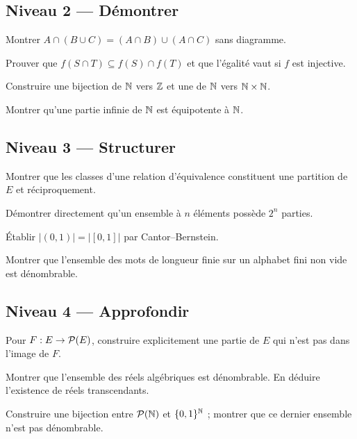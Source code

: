 \subsection*{Niveau 2 — Démontrer}
\begin{exercice}[Distributivité]\label{ex:ens:5}Montrer $A\cap(B\cup C)=(A\cap B)\cup(A\cap C)$ sans diagramme.\end{exercice}
\begin{exercice}\label{ex:ens:6}Prouver que $f(S\cap T)\subseteq f(S)\cap f(T)$ et que l'égalité vaut si $f$ est injective.\end{exercice}
\begin{exercice}\label{ex:ens:7}Construire une bijection de $\mathbb N$ vers $\mathbb Z$ et une de $\mathbb N$ vers $\mathbb N\times\mathbb N$.\end{exercice}
\begin{exercice}\label{ex:ens:8}Montrer qu'une partie infinie de $\mathbb N$ est équipotente à $\mathbb N$.\end{exercice}
\subsection*{Niveau 3 — Structurer}
\begin{exercice}\label{ex:ens:9}Montrer que les classes d'une relation d'équivalence constituent une partition de $E$ et réciproquement.\end{exercice}
\begin{exercice}\label{ex:ens:10}Démontrer directement qu'un ensemble à $n$ éléments possède $2^n$ parties.\end{exercice}
\begin{exercice}\label{ex:ens:11}Établir $|(0,1)|=|[0,1]|$ par Cantor--Bernstein.\end{exercice}
\begin{exercice}\label{ex:ens:12}Montrer que l'ensemble des mots de longueur finie sur un alphabet fini non vide est dénombrable.\end{exercice}
\subsection*{Niveau 4 — Approfondir}
\begin{exercice}\label{ex:ens:13}Pour $F:E\to\mathcal P(E)$, construire explicitement une partie de $E$ qui n'est pas dans l'image de $F$.\end{exercice}
\begin{exercice}\label{ex:ens:14}Montrer que l'ensemble des réels algébriques est dénombrable. En déduire l'existence de réels transcendants.\end{exercice}
\begin{exercice}\label{ex:ens:15}Construire une bijection entre $\mathcal P(\mathbb N)$ et $\{0,1\}^{\mathbb N}$ ; montrer que ce dernier ensemble n'est pas dénombrable.\end{exercice}
